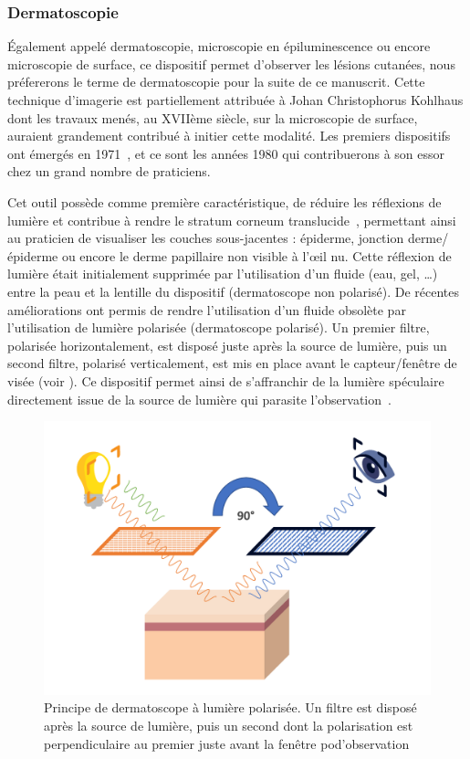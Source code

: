 \subsubsection{Dermatoscopie}
Également appelé dermatoscopie, microscopie en épiluminescence ou encore microscopie de surface, ce dispositif permet d’observer les lésions cutanées, nous préfererons le terme de dermatoscopie pour la suite de ce manuscrit. Cette technique d’imagerie est partiellement attribuée à Johan Christophorus Kohlhaus dont les travaux menés, au XVIIème siècle, sur la microscopie de surface, auraient grandement contribué à initier cette modalité. Les premiers dispositifs ont émergés en 1971~\cite{MacKie1972}, et ce sont les années 1980 qui contribuerons à son essor chez un grand nombre de praticiens.\par

Cet outil possède comme première caractéristique, de réduire les réflexions de lumière et contribue à rendre le stratum corneum translucide~\cite{Katz2001}, permettant ainsi au praticien de visualiser les couches sous-jacentes : épiderme, jonction derme/épiderme ou encore le derme papillaire non visible à l’œil nu. Cette réflexion de lumière était initialement supprimée par l’utilisation d’un fluide (eau, gel, …) entre la peau et la lentille du dispositif (dermatoscope non polarisé). De récentes améliorations ont permis de rendre l'utilisation d'un fluide obsolète par l'utilisation de lumière polarisée (dermatoscope polarisé). Un premier filtre, polarisée horizontalement, est disposé juste après la source de lumière, puis un second filtre, polarisé verticalement, est mis en place avant le capteur/fenêtre de visée (voir ). Ce dispositif permet ainsi de s'affranchir de la lumière spéculaire directement issue de la source de lumière qui parasite l'observation~\cite{Campos-do-Carmo2008}.\par

\begin{figure}[H]
\centering
    \includegraphics[width=0.85\linewidth]{contents/chapter_2/resources/polarized_dermoscopy.pdf}
    \caption{Principe de dermatoscope à lumière polarisée. Un filtre est disposé après la source de lumière, puis un second dont la polarisation est perpendiculaire au premier juste avant la fenêtre pod'observation~\cite{sonthalia2019}}
    \label{fig:polarized_dermoscopy}
\end{figure}\par

